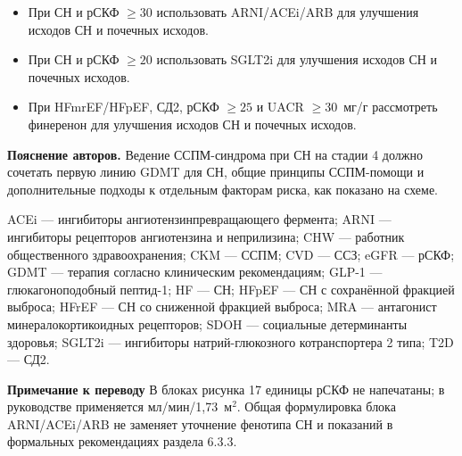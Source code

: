 \documentclass[11pt,a4paper]{article}
\newcommand{\editorial}[1]{\par\begingroup\small\color{black!70}\textbf{Примечание к переводу} #1\par\endgroup}
\newcommand{\unitgfr}{мл/мин/1,73~м$^2$}
\begin{document}
\begin{itemize}
\item При СН и рСКФ $\geq30$ использовать ARNI/ACEi/ARB для улучшения исходов СН и почечных исходов.
\item При СН и рСКФ $\geq20$ использовать SGLT2i для улучшения исходов СН и почечных исходов.
\item При HFmrEF/HFpEF, СД2, рСКФ $\geq25$ и UACR $\geq30$~мг/г рассмотреть финеренон для улучшения исходов СН и почечных исходов.
\end{itemize}
\textbf{Пояснение авторов.} Ведение ССПМ-синдрома при СН на стадии 4 должно сочетать первую линию GDMT для СН, общие принципы ССПМ-помощи и дополнительные подходы к отдельным факторам риска, как показано на схеме.

ACEi --- ингибиторы ангиотензинпревращающего фермента; ARNI --- ингибиторы рецепторов ангиотензина и неприлизина; CHW --- работник общественного здравоохранения; CKM --- ССПМ; CVD --- ССЗ; eGFR --- рСКФ; GDMT --- терапия согласно клиническим рекомендациям; GLP-1 --- глюкагоноподобный пептид-1; HF --- СН; HFpEF --- СН с сохранённой фракцией выброса; HFrEF --- СН со сниженной фракцией выброса; MRA --- антагонист минералокортикоидных рецепторов; SDOH --- социальные детерминанты здоровья; SGLT2i --- ингибиторы натрий-глюкозного котранспортера 2 типа; T2D --- СД2.
\editorial{В блоках рисунка 17 единицы рСКФ не напечатаны; в руководстве применяется \unitgfr. Общая формулировка блока ARNI/ACEi/ARB не заменяет уточнение фенотипа СН и показаний в формальных рекомендациях раздела 6.3.3.}
\end{document}
